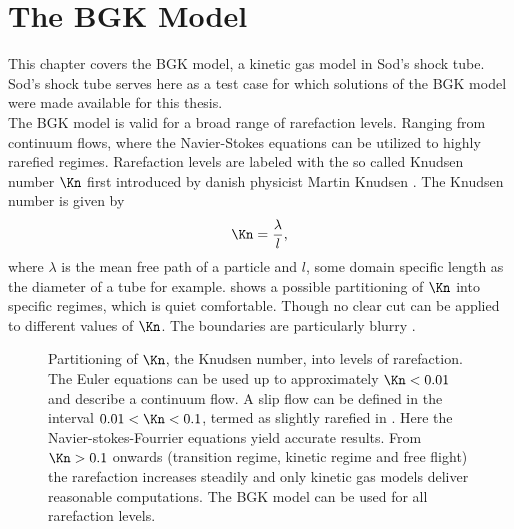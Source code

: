 

\chapter{The BGK Model}
\label{Ch:BGK}

This chapter covers the BGK model, a kinetic gas model in Sod's shock tube. Sod's shock tube serves here as a test case for which solutions of the BGK model were made available for this thesis.\\
The BGK model is valid for a broad range of rarefaction levels. Ranging from continuum flows, where the Navier-Stokes equations can be utilized to highly rarefied regimes. Rarefaction levels are labeled with the so called Knudsen number \(\Kn\) first introduced by danish physicist Martin Knudsen \cite{Bernard}. The Knudsen number is given by
\begin{equation}
	\Kn = \frac{\lambda}{l}, 
\end{equation}
where \(\lambda\) is the mean free path of a particle and \(l\), some domain specific length as the diameter of a tube for example.  shows a possible partitioning of \(\Kn\) into specific regimes, which is quiet comfortable. Though no clear cut can be applied to different values of \(\Kn\). The boundaries are particularly blurry \cite{schaaf}.
\begin{figure}[H]
	
	\caption{Partitioning of \(\Kn\), the Knudsen number, into levels of rarefaction. The Euler equations can be used up to approximately \(\Kn < 0.01\) and describe a \glqq continuum flow\grqq{}. A \grqq slip flow\grqq{} can be defined in the interval \(0.01 < \Kn < 0.1\), termed as slightly rarefied in \cite{schaaf}. Here the Navier-stokes-Fourrier equations yield accurate results. From \(\Kn > 0.1\) onwards (transition regime, kinetic regime and free flight) the rarefaction increases steadily and only kinetic gas models deliver reasonable computations. The BGK model can be used for all rarefaction levels.}
	\label{Fig:ExpKN}
\end{figure}

